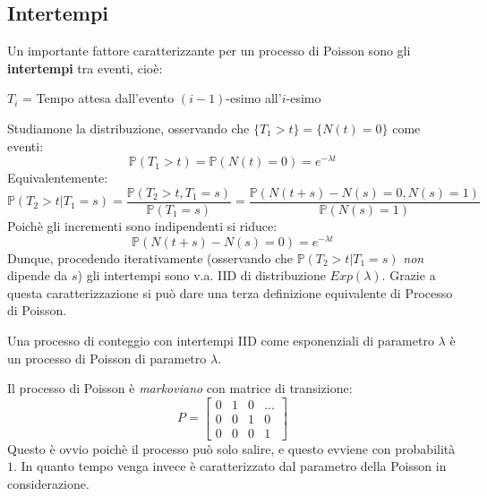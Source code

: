 \subsection{Intertempi}
\vspace{5px} 
Un importante fattore caratterizzante per un processo di Poisson sono gli \textbf{intertempi} tra eventi, cioè:
\begin{center}
$T_i$ = Tempo attesa dall'evento $(i-1)$-esimo all'$i$-esimo
\end{center}
Studiamone la distribuzione, osservando che $\{T_1>t\}=\{N(t)=0\}$ come eventi:
\[\mathbb{P}(T_1>t)=\mathbb{P}(N(t)=0)=e^{-\lambda t}\]
Equivalentemente:
\[\mathbb{P}(T_2>t|T_1=s)=\frac{\mathbb{P}(T_2>t,T_1=s)}{\mathbb{P}(T_1=s)}=\frac{\mathbb{P}(N(t+s)-N(s)=0,N(s)=1)}{\mathbb{P}(N(s)=1)}\]
Poichè gli incrementi sono indipendenti si riduce:
\[\mathbb{P}(N(t+s)-N(s)=0)=e^{-\lambda t}\]
Dunque, procedendo iterativamente (osservando che $\mathbb{P}(T_2>t|T_1=s)$ \textit{non} dipende da $s$) gli intertempi sono v.a. IID di distribuzione $Exp(\lambda)$. Grazie a questa caratterizzazione si può dare una terza definizione equivalente di Processo di Poisson.
\begin{definition}[Poisson 3]
Una processo di conteggio con intertempi IID come esponenziali di parametro $\lambda$ è un processo di Poisson di parametro $\lambda$.
\end{definition}

\begin{observation}
Il processo di Poisson è \textit{markoviano} con matrice di transizione:
\[P=\begin{bmatrix}
0 & 1 & 0 & \dots \\
0 & 0 & 1 & 0 \\
0 & 0 & 0 & 1
\end{bmatrix}\]
Questo è ovvio poichè il processo può solo salire, e questo evviene con probabilità $1$. In quanto tempo venga invece è caratterizzato dal parametro della Poisson in considerazione.
\end{observation}

